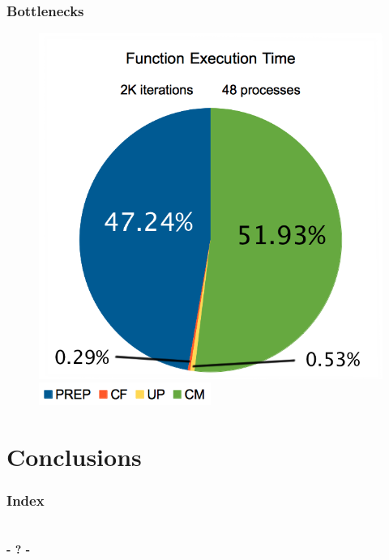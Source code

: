 \documentclass{beamer}
\begin{document}
\begin{frame}
	\frametitle{Bottlenecks}
	\begin{figure}
		\begin{center}
			\includegraphics[height=0.75\textheight]{images/may/load48.png}
			
			\includegraphics[width=0.5\textwidth]{images/may/legend.png}
		\end{center}
	\end{figure}
\end{frame}



%
%
%
%

\section{Conclusions}

\begin{frame}
	\frametitle{Index}
	\tableofcontents[currentsection]
\end{frame}

\begin{frame}

\end{frame}

\section{} %

\begin{frame}[plain]
	\titlepage
	\begin{center}
		\Huge\bfseries - ? -
	\end{center}
\end{frame}
\end{document}
